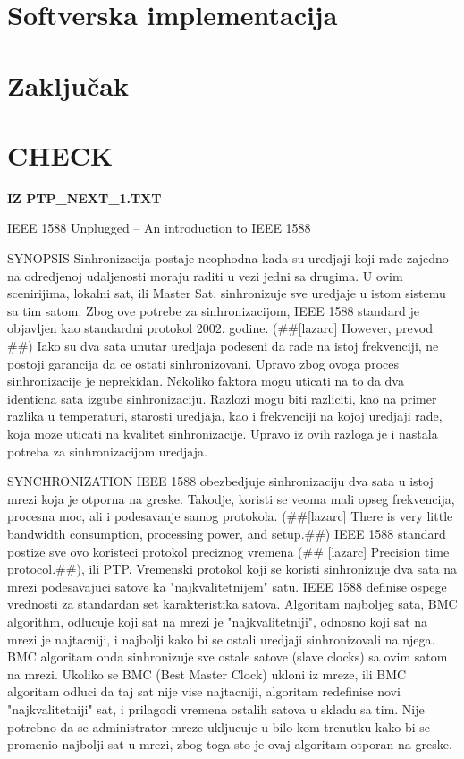 \documentclass[a4paper,12pt, master]{etf}
\begin{document}
	\newpage

	\chapter{Softverska implementacija}

	\newpage

	\chapter{Zaključak}

	\newpage

	\chapter{CHECK}
    
	\textbf{IZ PTP\_NEXT\_1.TXT}

	IEEE 1588 Unplugged – An introduction to IEEE 1588
	
	SYNOPSIS
	Sinhronizacija postaje neophodna kada su uredjaji koji rade zajedno na odredjenoj 
	udaljenosti moraju raditi u vezi jedni sa drugima. U ovim scenirijima, lokalni sat, ili 
	Master Sat, sinhronizuje sve uredjaje u istom sistemu sa tim satom. Zbog ove potrebe za 
	sinhronizacijom, IEEE 1588 standard je objavljen kao standardni protokol 2002. godine.
	(\#\#[lazarc] However, prevod \#\#) Iako su dva sata unutar uredjaja podeseni da rade na 
	istoj frekvenciji, ne postoji garancija da ce ostati sinhronizovani. Upravo zbog ovoga 
	proces sinhronizacije je neprekidan. Nekoliko faktora mogu uticati na to da dva identicna 
	sata izgube sinhronizaciju. Razlozi mogu biti razliciti, kao na primer razlika u 
	temperaturi, starosti uredjaja, kao i frekvenciji na kojoj uredjaji rade, koja moze 
	uticati na kvalitet sinhronizacije. Upravo iz ovih razloga je i nastala potreba za 
	sinhronizacijom uredjaja.
	
	SYNCHRONIZATION
	IEEE 1588 obezbedjuje sinhronizaciju dva sata u istoj mrezi koja je otporna na greske. 
	Takodje, koristi se veoma mali opseg frekvencija, procesna moc, ali i podesavanje samog 
	protokola. (\#\#[lazarc] There is very little bandwidth consumption, processing power, and 
	setup.\#\#) IEEE 1588 standard postize sve ovo koristeci protokol preciznog vremena (\#\#
	[lazarc] Precision time protocol.\#\#), ili PTP. Vremenski protokol koji se koristi 
	sinhronizuje dva sata na mrezi podesavajuci satove ka "najkvalitetnijem" satu. IEEE 1588 
	definise ospege vrednosti za standardan set karakteristika satova. Algoritam najboljeg 
	sata, BMC algorithm, odlucuje koji sat na mrezi je "najkvalitetniji", odnosno koji sat na 
	mrezi je najtacniji, i najbolji kako bi se ostali uredjaji sinhronizovali na njega. BMC 
	algoritam onda sinhronizuje sve ostale satove (slave clocks) sa ovim satom na mrezi. 
	Ukoliko se BMC (Best Master Clock) ukloni iz mreze, ili BMC algoritam odluci da taj sat 
	nije vise najtacniji, algoritam redefinise novi "najkvalitetniji" sat, i prilagodi 
	vremena ostalih satova u skladu sa tim. Nije potrebno da se administrator mreze ukljucuje 
	u bilo kom trenutku kako bi se promenio najbolji sat u mrezi, zbog toga sto je ovaj 
	algoritam otporan na greske.
	
\end{document}
